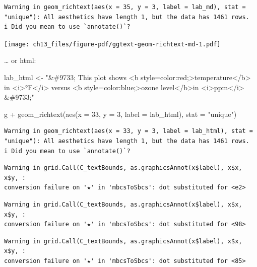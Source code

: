 \documentclass[
  letterpaper,
  DIV=11,
  numbers=noendperiod]{scrreprt}
\newenvironment{Shaded}{\begin{snugshade}}{\end{snugshade}}
\newcommand{\AttributeTok}[1]{\textcolor[rgb]{0.40,0.45,0.13}{#1}}
\newcommand{\DecValTok}[1]{\textcolor[rgb]{0.68,0.00,0.00}{#1}}
\newcommand{\FunctionTok}[1]{\textcolor[rgb]{0.28,0.35,0.67}{#1}}
\newcommand{\NormalTok}[1]{\textcolor[rgb]{0.00,0.23,0.31}{#1}}
\newcommand{\OtherTok}[1]{\textcolor[rgb]{0.00,0.23,0.31}{#1}}
\newcommand{\SpecialCharTok}[1]{\textcolor[rgb]{0.37,0.37,0.37}{#1}}
\newcommand{\StringTok}[1]{\textcolor[rgb]{0.13,0.47,0.30}{#1}}
\begin{document}
\begin{verbatim}
Warning in geom_richtext(aes(x = 35, y = 3, label = lab_md), stat = "unique"): All aesthetics have length 1, but the data has 1461 rows.
i Did you mean to use `annotate()`?
\end{verbatim}

\texttt{[image: ch13\_files/figure-pdf/ggtext-geom-richtext-md-1.pdf]}

\ldots{} or html:

\begin{Shaded}
\begin{Highlighting}[]
\NormalTok{lab\_html }\OtherTok{\textless{}{-}} \StringTok{"\&\#9733; This plot shows \textless{}b style=\textquotesingle{}color:red;\textquotesingle{}\textgreater{}temperature\textless{}/b\textgreater{} in \textless{}i\textgreater{}°F\textless{}/i\textgreater{} versus \textless{}b style=\textquotesingle{}color:blue;\textquotesingle{}\textgreater{}ozone level\textless{}/b\textgreater{}in \textless{}i\textgreater{}ppm\textless{}/i\textgreater{} \&\#9733;"}

\NormalTok{g }\SpecialCharTok{+}
  \FunctionTok{geom\_richtext}\NormalTok{(}\FunctionTok{aes}\NormalTok{(}\AttributeTok{x =} \DecValTok{33}\NormalTok{, }\AttributeTok{y =} \DecValTok{3}\NormalTok{, }\AttributeTok{label =}\NormalTok{ lab\_html),}
                \AttributeTok{stat =} \StringTok{"unique"}\NormalTok{)}
\end{Highlighting}
\end{Shaded}

\begin{verbatim}
Warning in geom_richtext(aes(x = 33, y = 3, label = lab_html), stat = "unique"): All aesthetics have length 1, but the data has 1461 rows.
i Did you mean to use `annotate()`?
\end{verbatim}

\begin{verbatim}
Warning in grid.Call(C_textBounds, as.graphicsAnnot(x$label), x$x, x$y, :
conversion failure on '★' in 'mbcsToSbcs': dot substituted for <e2>
\end{verbatim}

\begin{verbatim}
Warning in grid.Call(C_textBounds, as.graphicsAnnot(x$label), x$x, x$y, :
conversion failure on '★' in 'mbcsToSbcs': dot substituted for <98>
\end{verbatim}

\begin{verbatim}
Warning in grid.Call(C_textBounds, as.graphicsAnnot(x$label), x$x, x$y, :
conversion failure on '★' in 'mbcsToSbcs': dot substituted for <85>
\end{verbatim}
\end{document}
